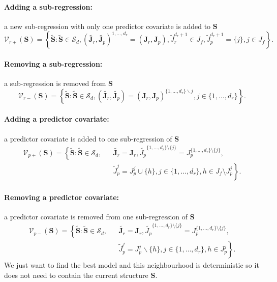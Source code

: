 \documentclass[12pt,a4paper]{report}
\begin{document}
	\paragraph{Adding a sub-regression:} a new sub-regression with only one predictor covariate is added to $\boldsymbol{S}$
\begin{equation}
\mathcal{V}_{r+}(\boldsymbol{S}) = \left\{\tilde{\boldsymbol{S}}: \tilde{\boldsymbol{S}}\in\mathcal{S}_d, (\tilde{\boldsymbol{J}_r},\tilde{\boldsymbol{J}_p})^{1,\ldots,d_r}=(\boldsymbol{J}_r,\boldsymbol{J}_p), \tilde{J}_r^{d_r+1}\in J_f, \tilde{J}_p^{d_r+1}=\{j\}, j\in J_f \right\}. \nonumber
\end{equation}	
		\paragraph{Removing a sub-regression:} a sub-regression  is removed from $\boldsymbol{S}$
\begin{equation}
\mathcal{V}_{r-}(\boldsymbol{S}) = \left\{\tilde{\boldsymbol{S}}: \tilde{\boldsymbol{S}}\in\mathcal{S}_d, (\tilde{\boldsymbol{J}_r},\tilde{\boldsymbol{J}_p})=(\boldsymbol{J}_r,\boldsymbol{J}_p)^{\{1,\ldots,d_r\}\backslash j}, j\in\{1,\ldots,d_r\} \right\}. \nonumber
\end{equation}	
	\paragraph{Adding a predictor covariate:} a predictor covariate is added to one sub-regression of $\boldsymbol{S}$
\begin{eqnarray}
\mathcal{V}_{p+}(\boldsymbol{S}) = \left\{\tilde{\boldsymbol{S}}:  \tilde{\boldsymbol{S}}\in\mathcal{S}_d,\right. && \tilde{\boldsymbol{J}_r}=\boldsymbol{J}_r, \tilde{J_p}^{\{1,\dots,d_r \}\setminus \{j\}}=J_p^{\{1,\dots,d_r \}\setminus \{j\}} , \nonumber \\
& & \left. \tilde{J}_p^{j}=J_p^{j} \cup \{h\}, j\in \{1,\ldots,d_r\}, h\in J_f \setminus J_p^j\right\}. \nonumber
\end{eqnarray}
	\paragraph{Removing a predictor covariate:} a predictor covariate is removed from one sub-regression of $\boldsymbol{S}$
\begin{eqnarray}
\mathcal{V}_{p-}(\boldsymbol{S}) = \left\{\tilde{\boldsymbol{S}}: \tilde{\boldsymbol{S}}\in\mathcal{S}_d,\right. && \tilde{\boldsymbol{J}_r}=\boldsymbol{J}_r,\tilde{J_p}^{\{1,\dots,d_r \}\setminus \{j\}}=J_p^{\{1,\dots,d_r \}\setminus \{j\}} , \nonumber \\
& & \left.  \tilde{J}_p^{j}=J_p^{j} \backslash \{h\}, j\in \{1,\ldots,d_r\}, h\in  J_p^j \right\}. \nonumber
\end{eqnarray}	
	We just want to find the best model and this neighbourhood is deterministic so it does not need to contain the current structure $\boldsymbol{S}$.
	
\end{document}
